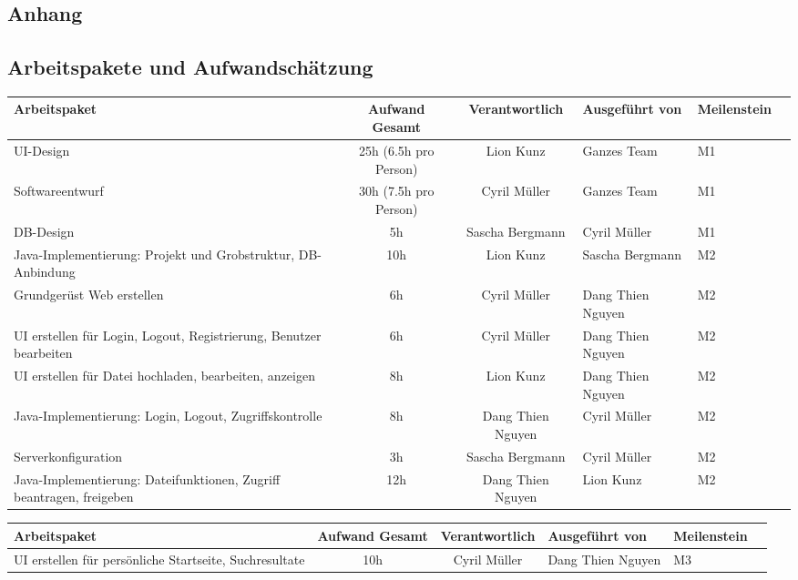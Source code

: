 \begin{landscape}
\section{Anhang}
\subsection{Arbeitspakete und Aufwandschätzung}
\label{sub:arbeitspakete_und_aufwandschaetzung}
\begin{tabularx}{\linewidth}{|X|c|c|l|l|c|} \hline
\textbf{Arbeitspaket}&	\textbf{Aufwand Gesamt}&		\textbf{Verantwortlich}&	\textbf{Ausgeführt von}&	\textbf{Meilenstein}\\ \hline
UI-Design 																&	25h (6.5h pro Person)	&	Lion Kunz		&	Ganzes Team&	M1\\ \hline
Softwareentwurf															&	30h (7.5h pro Person)	&	Cyril Müller	&	Ganzes Team&	M1\\ \hline
DB-Design																&	5h	&	Sascha Bergmann	&	Cyril Müller&	M1\\ \hline
Java-Implementierung: Projekt und Grobstruktur, DB-Anbindung			&	10h	&	Lion Kunz		&	Sascha Bergmann&	M2\\ \hline
Grundgerüst Web erstellen												&	6h 	&	Cyril Müller	&	Dang Thien Nguyen&	M2\\ \hline
UI erstellen für Login, Logout, Registrierung, Benutzer bearbeiten		&	6h	&	Cyril Müller	&	Dang Thien Nguyen&	M2\\ \hline
UI erstellen für Datei hochladen, bearbeiten, anzeigen					&	8h	&	Lion Kunz		&	Dang Thien Nguyen&	M2\\ \hline
Java-Implementierung: Login, Logout, Zugriffskontrolle					&	8h	&	Dang Thien Nguyen&	Cyril Müller&	M2\\ \hline
Serverkonfiguration														&	3h	&	Sascha Bergmann	&	Cyril Müller&	M2\\ \hline
Java-Implementierung: Dateifunktionen, Zugriff beantragen, freigeben	&	12h	&	Dang Thien Nguyen&	Lion Kunz&	M2\\ \hline
\end{tabularx}
\clearpage
\begin{tabularx}{\linewidth}{|X|c|c|l|l|c|} \hline
\textbf{Arbeitspaket}&	\textbf{Aufwand Gesamt}&		\textbf{Verantwortlich}&	\textbf{Ausgeführt von}&	\textbf{Meilenstein}\\ \hline
UI erstellen für persönliche Startseite, Suchresultate					&	10h	&	Cyril Müller	&	Dang Thien Nguyen&	M3\\ \hline

\end{tabularx}
\end{landscape}
